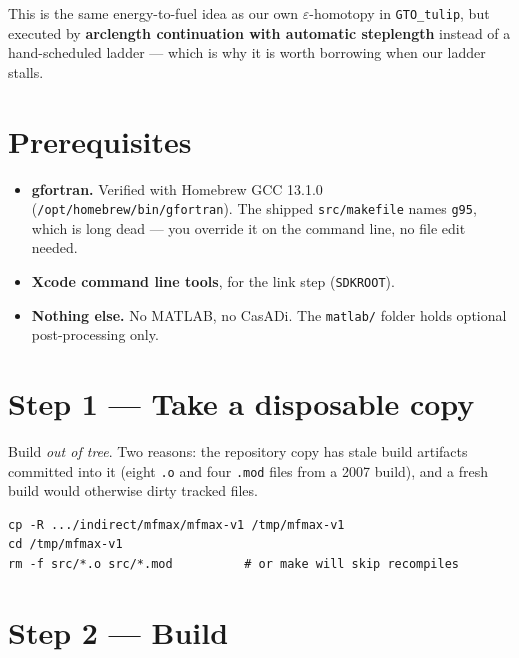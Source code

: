 \documentclass[11pt]{article}
\newcommand{\code}[1]{\texttt{\small #1}}
\newcommand{\file}[1]{\texttt{\small #1}}
\begin{document}
\noindent
This is the same energy-to-fuel idea as our own $\varepsilon$-homotopy in
\file{GTO\_tulip}, but executed by \textbf{arclength continuation with
automatic steplength} instead of a hand-scheduled ladder --- which is why it
is worth borrowing when our ladder stalls.

\section{Prerequisites}

\begin{itemize}
\item \textbf{gfortran.} Verified with Homebrew GCC 13.1.0
      (\file{/opt/homebrew/bin/gfortran}). The shipped \file{src/makefile}
      names \code{g95}, which is long dead --- you override it on the command
      line, no file edit needed.
\item \textbf{Xcode command line tools}, for the link step
      (\code{SDKROOT}).
\item \textbf{Nothing else.} No MATLAB, no CasADi. The \file{matlab/} folder
      holds optional post-processing only.
\end{itemize}

\section{Step 1 --- Take a disposable copy}

Build \emph{out of tree}. Two reasons: the repository copy has stale build
artifacts committed into it (eight \file{.o} and four \file{.mod} files from a
2007 build), and a fresh build would otherwise dirty tracked files.

\begin{lstlisting}
cp -R .../indirect/mfmax/mfmax-v1 /tmp/mfmax-v1
cd /tmp/mfmax-v1
rm -f src/*.o src/*.mod          # or make will skip recompiles
\end{lstlisting}

\section{Step 2 --- Build}\label{sec:build}
\end{document}
